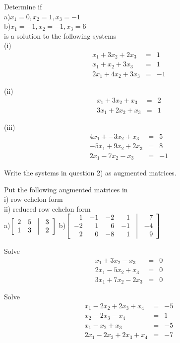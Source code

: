 \item Determine if\\ a)$x_1=0,x_2=1,x_3=-1$\\  b)$x_1=-1,x_2=-1,x_3=6$\\ is a solution to the following
systems\\
(i)
$$\begin{array}{rrr}
x_1+3x_2+2x_3&=&1\\
x_1+x_2+3x_3&=&1\\
2x_1+4x_2+3x_3&=&-1
\end{array}$$

(ii)
$$\begin{array}{rrr}
x_1+3x_2+x_3&=&2\\
3x_1+2x_2+x_3&=&1
\end{array}$$

(iii)
$$\begin{array}{rrr}
4x_1+-3x_2+x_3&=&5\\
-5x_1+9x_2+2x_3&=&8\\
2x_1-7x_2-x_3&=&-1
\end{array}$$

\item Write the systems in question 2) as augmented matrices.

\item Put the following augmented matrices  in\\
i) row echelon form\\
ii) reduced row echelon form\\
a)$\left [\begin {array}{rrrr} 2&5&\vline&3\\1&3&\vline&2\end {array}
\right ]$
b)$\left [\begin {array}{rrrrrr} 1&-1&-2&1&\vline&7\\-2&1&6&-1
&\vline&-4\\2&0&-8&1&\vline&9\end {array}\right ]$

\item Solve
\begin{eqnarray*} x_1+3x_2-x_3&=&0\\
2x_1-5x_2+x_3&=&0\\ 3x_1+7x_2-2x_3&=&0 \end{eqnarray*}

\item Solve
$$\begin{array}{rrr} x_1-2x_2+2x_3+x_4&=&-5\\
x_2-2x_3-x_4&=&1\\ x_1-x_2+x_3&=&-5\\ 2x_1-2x_2+2x_3+x_4&=&-7
\end{array}$$

